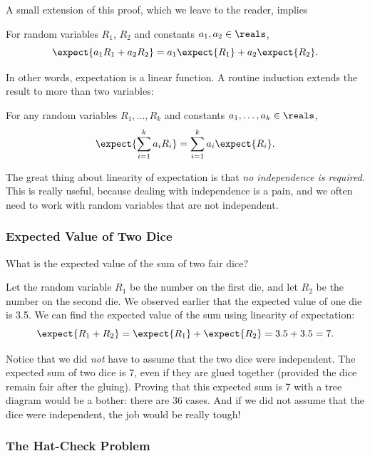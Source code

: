A small extension of this proof, which we leave to the reader, implies
\begin{theorem}
For random variables $R_1$, $R_2$ and constants $a_1,a_2 \in \reals$,
\[
\expect{a_1R_1 + a_2R_2} = a_1\expect{R_1} + a_2\expect{R_2}.
\]
\end{theorem}
In other words, expectation is a linear function.  A routine induction
extends the result to more than two variables:
\begin{corollary}
For any random variables $R_1, \dots, R_k$ and constants $a_1, \dots, a_k
\in \reals$,
\[
\expect{\sum_{i=1}^k a_iR_i} = \sum_{i=1}^k a_i\expect{R_i}.
\]
\end{corollary}

The great thing about linearity of expectation is that \emph{no
independence is required}.  This is really useful, because dealing with
independence is a pain, and we often need to work with random variables
that are not independent.

\subsubsection{Expected Value of Two Dice}

What is the expected value of the sum of two fair dice?

Let the random variable $R_1$ be the number on the first die, and let
$R_2$ be the number on the second die.  We observed earlier that the
expected value of one die is 3.5.  We can find the expected value of the
sum using linearity of expectation:
\begin{equation*}
\expect{R_1 + R_2} 
 =   \expect{R_1} + \expect{R_2}
 =    3.5 + 3.5
 =    7.
\end{equation*}

Notice that we did {\em not} have to assume that the two dice were
independent.  The expected sum of two dice is 7, even if they are glued
together (provided the dice remain fair after the gluing).  Proving that
this expected sum is 7 with a tree diagram would be a bother: there are 36
cases.  And if we did not assume that the dice were independent, the job
would be really tough!

\subsubsection{The Hat-Check Problem}

